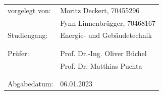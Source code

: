 \vspace*{1cm}
\large
\begin{center}
	\begin{tabular}{ll}
		vorgelegt von: & Moritz Deckert, 70455296 \vspace{2mm}\\	
		& Fynn Linnenbrügger, 70468167 \vspace{2mm}\\	
		Studiengang: & Energie- und Gebäudetechnik \vspace{2mm}\\
		& \\
		& \\	
		Prüfer:&Prof. Dr.-Ing. Oliver Büchel \vspace{2mm}\\	
		& Prof. Dr. Matthias Puchta \vspace{2mm}\\	
		& \\
		& \\
		Abgabedatum:& 06.01.2023
	\end{tabular}
\end{center}
